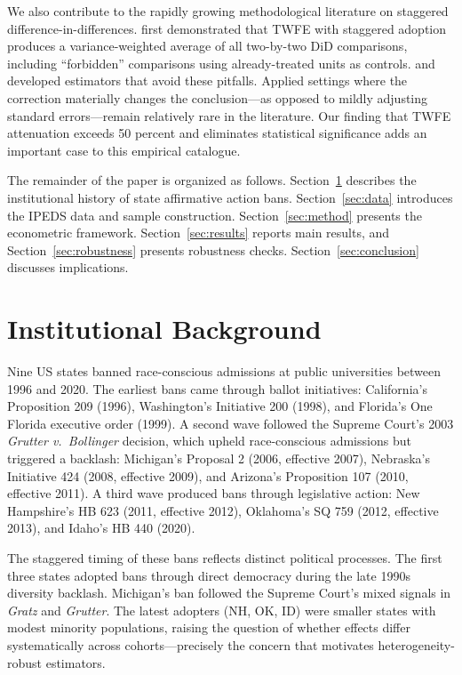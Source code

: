 \documentclass[12pt]{article}
\begin{document}
We also contribute to the rapidly growing methodological literature on staggered difference-in-differences. \citet{goodman2021difference} first demonstrated that TWFE with staggered adoption produces a variance-weighted average of all two-by-two DiD comparisons, including ``forbidden'' comparisons using already-treated units as controls. \citet{callaway2021difference} and \citet{sun2021estimating} developed estimators that avoid these pitfalls. Applied settings where the correction materially changes the conclusion---as opposed to mildly adjusting standard errors---remain relatively rare in the literature. Our finding that TWFE attenuation exceeds 50 percent and eliminates statistical significance adds an important case to this empirical catalogue.

The remainder of the paper is organized as follows. Section~\ref{sec:background} describes the institutional history of state affirmative action bans. Section~\ref{sec:data} introduces the IPEDS data and sample construction. Section~\ref{sec:method} presents the econometric framework. Section~\ref{sec:results} reports main results, and Section~\ref{sec:robustness} presents robustness checks. Section~\ref{sec:conclusion} discusses implications.


\section{Institutional Background}
\label{sec:background}

Nine US states banned race-conscious admissions at public universities between 1996 and 2020. The earliest bans came through ballot initiatives: California's Proposition 209 (1996), Washington's Initiative 200 (1998), and Florida's One Florida executive order (1999). A second wave followed the Supreme Court's 2003 \textit{Grutter v.\ Bollinger} decision, which upheld race-conscious admissions but triggered a backlash: Michigan's Proposal 2 (2006, effective 2007), Nebraska's Initiative 424 (2008, effective 2009), and Arizona's Proposition 107 (2010, effective 2011). A third wave produced bans through legislative action: New Hampshire's HB 623 (2011, effective 2012), Oklahoma's SQ 759 (2012, effective 2013), and Idaho's HB 440 (2020).

The staggered timing of these bans reflects distinct political processes. The first three states adopted bans through direct democracy during the late 1990s diversity backlash. Michigan's ban followed the Supreme Court's mixed signals in \textit{Gratz} and \textit{Grutter}. The latest adopters (NH, OK, ID) were smaller states with modest minority populations, raising the question of whether effects differ systematically across cohorts---precisely the concern that motivates heterogeneity-robust estimators.
\end{document}
